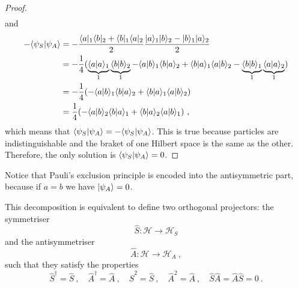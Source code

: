 \begin{proof}
\begin{equation*}
\begin{aligned}
    \end{aligned}
    \end{equation*}
    and 
    \begin{equation*}
    \begin{aligned}
        - \langle\psi_S\vert\psi_A\rangle & = - \frac{\langle a\vert_1\langle b\vert_2 + \langle b\vert_1\langle a\vert_2}{2} \frac{\vert a\rangle_1 \vert b\rangle_2 - \vert b\rangle_1 \vert a\rangle_2}{2} \\ & = - \frac{1}{4} (\underbrace{\langle a\vert a\rangle_1}_1 \underbrace{\langle b\vert b\rangle_2}_1 - \langle a\vert b\rangle_1 \langle b\vert a\rangle_2 + \langle b\vert a\rangle_1 \langle a\vert b\rangle_2 - \underbrace{\langle b\vert b\rangle_1}_1 \underbrace{\langle a\vert a\rangle_2}_1) \\ & = - \frac{1}{4} (- \langle a\vert b\rangle_1 \langle b\vert a\rangle_2 + \langle b\vert a\rangle_1 \langle a\vert b\rangle_2) \\ & = \frac{1}{4} (- \langle a\vert b\rangle_2 \langle b\vert a\rangle_1 + \langle b\vert a\rangle_2 \langle a\vert b\rangle_1 ) ~,
    \end{aligned}
    \end{equation*}
    which means that $\langle\psi_S\vert\psi_A\rangle = - \langle\psi_S\vert\psi_A\rangle$. This is true because particles are indistinguishable and the braket of one Hilbert space is the same as the other. Therefore, the only solution is $\langle\psi_S\vert\psi_A\rangle = 0$.
    \end{proof}
    
    Notice that Pauli's exclusion principle is encoded into the antisymmetric part, because if $a = b$ we have $\vert\psi_A\rangle = 0$.

    This decomposition is equivalent to define two orthogonal projectors: the symmetriser 
    \begin{equation*}
        \hat S \colon \mathcal H \rightarrow \mathcal H_S
    \end{equation*}
    and the antisymmetriser 
    \begin{equation*}
        \hat A \colon \mathcal H \rightarrow \mathcal H_A ~,
    \end{equation*}
    such that they satisfy the properties 
    \begin{equation}\label{projprop}
        \hat S^\dagger = \hat S~, \quad \hat A^\dagger = \hat A~, \quad \hat S^2 = \hat S~, \quad \hat A^2 = \hat A~, \quad \hat S \hat A = \hat A \hat S = 0 ~.
    \end{equation}

